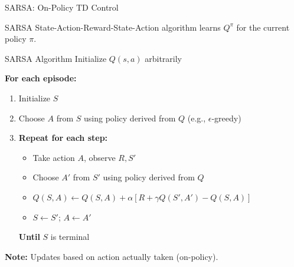\documentclass[aspectratio=169]{beamer}
\begin{document}
\begin{frame}{SARSA: On-Policy TD Control}
  \begin{definitionbox}{SARSA}
    State-Action-Reward-State-Action algorithm learns $Q^\pi$ for the current policy $\pi$.
  \end{definitionbox}

  \vspace{0.5em}

  \begin{examplebox}{SARSA Algorithm}
    Initialize $Q(s,a)$ arbitrarily

    \textbf{For each episode:}
    \begin{enumerate}
      \item Initialize $S$
      \item Choose $A$ from $S$ using policy derived from $Q$ (e.g., $\epsilon$-greedy)
      \item \textbf{Repeat for each step:}
      \begin{itemize}
        \item Take action $A$, observe $R, S'$
        \item Choose $A'$ from $S'$ using policy derived from $Q$
        \item $Q(S,A) \leftarrow Q(S,A) + \alpha[R + \gamma Q(S',A') - Q(S,A)]$
        \item $S \leftarrow S'$; $A \leftarrow A'$
      \end{itemize}
      \textbf{Until} $S$ is terminal
    \end{enumerate}
  \end{examplebox}

  \textbf{Note:} Updates based on action actually taken (\alert{on-policy}).
\end{frame}
\end{document}
